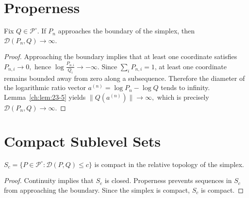 \section{Properness}\label{ch:sec:properness}
\begin{theorem}[Properness]
\label{ch:thm:23-6}
Fix \(Q\in\mathcal P^\circ\). If \(P_n\) approaches
the boundary of the simplex, then
$\mathcal D(P_n,Q)\to\infty.$
\end{theorem}
\begin{proof} Approaching the boundary implies that at least one coordinate
satisfies
$P_{n,i}\to0,$
hence
$\log\frac{P_{n,i}}{Q_i}\to-\infty.$
Since \(\sum_i P_{n,i}=1\), at least one coordinate remains bounded
away from zero along a subsequence. Therefore the diameter of the
logarithmic ratio vector
$a^{(n)}=\log P_n-\log Q$
tends to infinity. Lemma~\ref{ch:lem:23-5} yields
$\|Q(a^{(n)})\|\to\infty,$ which is precisely \(\mathcal D(P_n,Q)\to\infty\). 
\end{proof}
\section{Compact Sublevel Sets}\label{ch:sec:compact-sublevel-sets}
\begin{corollary}
\label{ch:cor:23-7}
$S_c=\{P\in\mathcal P^\circ:\mathcal D(P,Q)\le c\}$
is compact in the relative topology of the simplex.
\end{corollary}
\begin{proof} Continuity implies that \(S_c\) is closed. Properness prevents
sequences in \(S_c\) from approaching the boundary. Since the simplex is
compact, \(S_c\) is compact. 
\end{proof}
